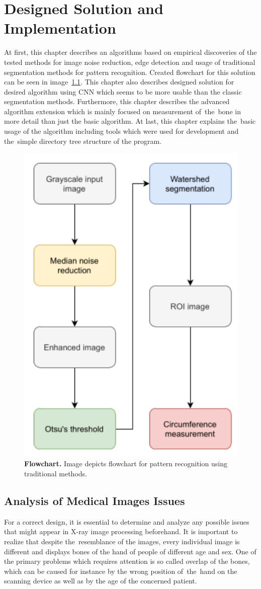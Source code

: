 \chapter{Designed Solution and Implementation}
\label{chapter3}
At first, this chapter describes an algorithms based on empirical discoveries of the tested methods for image noise reduction, edge detection and usage of traditional segmentation methods for pattern recognition. Created flowchart for this solution can be seen in image~\ref{flowchart1}. This chapter also describes designed solution for desired algorithm using CNN which seems to be more usable than the classic segmentation methods. Furthermore, this chapter describes the advanced algorithm extension which is mainly focused on measurement of~the~bone in more detail than just the basic algorithm. At last, this chapter explains the~basic usage of the algorithm including tools which were used for development and the~simple directory tree structure of the program.

\begin{figure}[!ht]
    \centering
    \includegraphics[width=.4\textwidth]{obrazky-figures/unsuccessful.pdf}
    \caption{\textbf{Flowchart.} Image depicts flowchart for pattern recognition using traditional methods.}
    \label{flowchart1}
\end{figure}

\section{Analysis of Medical Images Issues}
For a correct design, it is essential to determine and analyze any possible issues that might appear in X-ray image processing beforehand. It is important to realize that despite the~resemblance of the images, every individual image is different and displays bones of the hand of people of different age and sex. One of the primary problems which requires attention is so called overlap of the bones, which can be caused for instance by the wrong position of~the~hand on the scanning device as well as by the age of the concerned patient.

